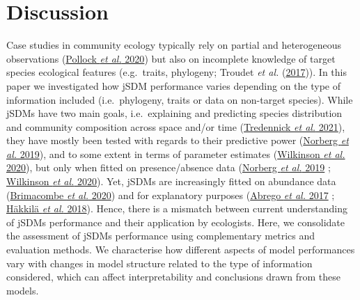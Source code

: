 \documentclass[9pt,biorxiv,doublespacing,lineno]{lapreprint}
\begin{document}
\hypertarget{discussion}{%
\section{Discussion}\label{discussion}}

Case studies in community ecology typically rely on partial and
heterogeneous observations (\protect\hyperlink{ref-Pollock_2020}{Pollock
\emph{et al.} 2020}) but also on incomplete knowledge of target species
ecological features (e.g.~traits, phylogeny; Troudet \emph{et al.}
(\protect\hyperlink{ref-Troudet_2017}{2017})). In this paper we
investigated how jSDM performance varies depending on the type of
information included (i.e.~phylogeny, traits or data on non-target
species). While jSDMs have two main goals, i.e.~explaining and
predicting species distribution and community composition across space
and/or time (\protect\hyperlink{ref-Tredennick_2021}{Tredennick \emph{et
al.} 2021}), they have mostly been tested with regards to their
predictive power (\protect\hyperlink{ref-Norberg_2019}{Norberg \emph{et
al.} 2019}), and to some extent in terms of parameter estimates
(\protect\hyperlink{ref-Wilkinson_2020}{Wilkinson \emph{et al.} 2020}),
but only when fitted on presence/absence data
(\protect\hyperlink{ref-Norberg_2019}{Norberg \emph{et al.} 2019} ;
\protect\hyperlink{ref-Wilkinson_2020}{Wilkinson \emph{et al.} 2020}).
Yet, jSDMs are increasingly fitted on abundance data
(\protect\hyperlink{ref-Brimacombe_2020}{Brimacombe \emph{et al.} 2020})
and for explanatory purposes (\protect\hyperlink{ref-Abrego_2016}{Abrego
\emph{et al.} 2017} ; \protect\hyperlink{ref-Hakkila_2018}{Häkkilä
\emph{et al.} 2018}). Hence, there is a mismatch between current
understanding of jSDMs performance and their application by ecologists.
Here, we consolidate the assessment of jSDMs performance using
complementary metrics and evaluation methods. We characterise how
different aspects of model performances vary with changes in model
structure related to the type of information considered, which can
affect interpretability and conclusions drawn from these models.
\end{document}
